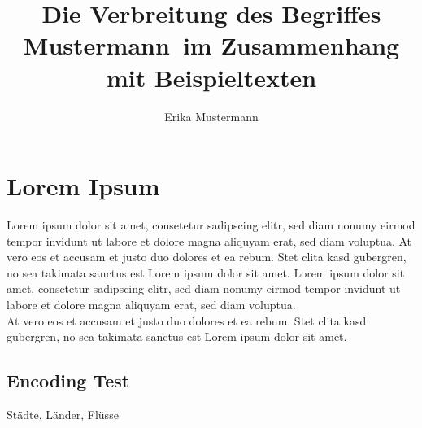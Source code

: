 \documentclass[f,bachelor,binding,twoside,palatino]{WeSTthesis}
\author{Erika Mustermann}
\title{Die Verbreitung des Begriffes \glqq Mustermann\grqq\ im Zusammenhang mit Beispieltexten}
\begin{document}

\maketitle %


\tableofcontents

\varclearpage



\section{Lorem Ipsum}
Lorem ipsum dolor sit amet, consetetur sadipscing elitr, sed diam nonumy eirmod tempor invidunt ut labore et dolore magna aliquyam erat, sed diam voluptua. At vero eos et accusam et justo duo dolores et ea rebum. Stet clita kasd gubergren, no sea takimata sanctus est Lorem ipsum dolor sit amet. Lorem ipsum dolor sit amet, consetetur sadipscing elitr, sed diam nonumy eirmod tempor invidunt ut labore et dolore magna aliquyam erat, sed diam voluptua.\\
At vero eos et accusam et justo duo dolores et ea rebum. Stet clita kasd gubergren, no sea takimata sanctus est Lorem ipsum dolor sit amet.

\subsection{Encoding Test}
Städte, Länder, Flüsse
\end{document}
